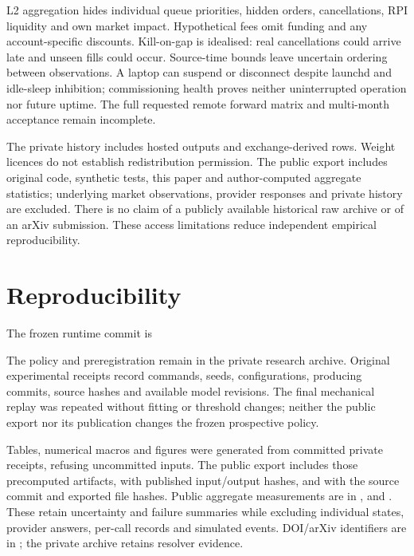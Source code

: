 \documentclass[11pt]{article}
\begin{document}
L2 aggregation hides individual queue priorities, hidden orders, cancellations,
RPI liquidity and own market impact. Hypothetical fees omit funding and any
account-specific discounts. Kill-on-gap is idealised: real cancellations could
arrive late and unseen fills could occur. Source-time bounds leave uncertain
ordering between observations. A laptop can suspend or disconnect despite
launchd and idle-sleep inhibition; commissioning health proves neither uninterrupted
operation nor future uptime. The full requested remote forward matrix and
multi-month acceptance remain incomplete.

The private history includes hosted outputs and exchange-derived rows. Weight
licences do not establish redistribution permission. The public export includes
original code, synthetic tests, this paper and author-computed aggregate statistics;
underlying market observations, provider responses and private history are excluded.
There is no claim of a publicly available historical raw archive or of an arXiv
submission. These access limitations reduce independent empirical reproducibility.

\section{Reproducibility}
The frozen runtime commit is
\begin{center}\small\texttt{\FrozenCommit}\end{center}
The policy and preregistration remain in the private research archive. Original
experimental receipts record commands, seeds, configurations, producing commits,
source hashes and available model revisions. The final mechanical replay was
repeated without fitting or threshold changes; neither the public export nor its
publication changes the frozen prospective policy.

Tables, numerical macros and figures were generated from committed private
receipts, refusing uncommitted inputs. The public export includes those precomputed
artifacts,  with published input/output hashes,
and  with the source commit and exported file hashes.
Public aggregate measurements are in ,
 and .
These retain uncertainty and failure summaries while excluding individual states,
provider answers, per-call records and simulated events. DOI/arXiv identifiers are
in ; the private archive retains resolver evidence.
\end{document}
